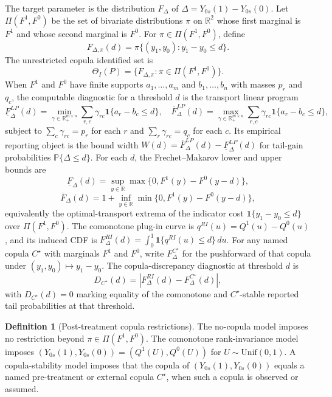 \documentclass[11pt]{article}
\renewcommand{\Pr}{\mathbb{P}}
\newcommand{\one}{\mathbf{1}}
\newcommand{\R}{\mathbb{R}}
\theoremstyle{definition}
\newtheorem{definition}{Definition}
\theoremstyle{plain}
\theoremstyle{remark}
\begin{document}
The target parameter is the distribution \(F_\Delta\) of \(\Delta=Y_{0s}(1)-Y_{0s}(0)\).  Let \(\Pi(F^1,F^0)\) be the set of bivariate distributions \(\pi\) on \(\R^2\) whose first marginal is \(F^1\) and whose second marginal is \(F^0\).  For \(\pi\in\Pi(F^1,F^0)\), define
\[
F_{\Delta,\pi}(d)=\pi\{(y_1,y_0):y_1-y_0\le d\}.
\]
The unrestricted copula identified set is
\[
\Theta_I(P)=\{F_{\Delta,\pi}:\pi\in\Pi(F^1,F^0)\}.
\]
When \(F^1\) and \(F^0\) have finite supports \(a_1,\ldots,a_m\) and \(b_1,\ldots,b_n\) with masses \(p_r\) and \(q_c\), the computable diagnostic for a threshold \(d\) is the transport linear program
\[
\underline F_\Delta^{LP}(d)=\min_{\gamma\in\R_+^{m\times n}}\sum_{r,c}\gamma_{rc}\one\{a_r-b_c\le d\},
\quad
\overline F_\Delta^{LP}(d)=\max_{\gamma\in\R_+^{m\times n}}\sum_{r,c}\gamma_{rc}\one\{a_r-b_c\le d\},
\]
subject to \(\sum_c\gamma_{rc}=p_r\) for each \(r\) and \(\sum_r\gamma_{rc}=q_c\) for each \(c\).  Its empirical reporting object is the bound width \(W(d)=\overline F_\Delta^{LP}(d)-\underline F_\Delta^{LP}(d)\) for tail-gain probabilities \(\Pr\{\Delta\le d\}\).
For each \(d\), the Frechet--Makarov lower and upper bounds are
\[
\underline F_\Delta(d)=\sup_{y\in\R}\max\{0,F^1(y)-F^0(y-d)\},
\]
\[
\overline F_\Delta(d)=1+\inf_{y\in\R}\min\{0,F^1(y)-F^0(y-d)\},
\]
equivalently the optimal-transport extrema of the indicator cost \(\one\{y_1-y_0\le d\}\) over \(\Pi(F^1,F^0)\).  The comonotone plug-in curve is \(q^{RI}(u)=Q^1(u)-Q^0(u)\), and its induced CDF is \(F^{RI}_\Delta(d)=\int_0^1\one\{q^{RI}(u)\le d\}\,du\).
For any named copula \(C^\star\) with marginals \(F^1\) and \(F^0\), write \(F^{C^\star}_\Delta\) for the pushforward of that copula under \((y_1,y_0)\mapsto y_1-y_0\).  The copula-discrepancy diagnostic at threshold \(d\) is
\[
D_{C^\star}(d)=|F^{RI}_\Delta(d)-F^{C^\star}_\Delta(d)|,
\]
with \(D_{C^\star}(d)=0\) marking equality of the comonotone and \(C^\star\)-stable reported tail probabilities at that threshold.

\begin{definition}[Post-treatment copula restrictions]\label{def:copulas}
The no-copula model imposes no restriction beyond \(\pi\in\Pi(F^1,F^0)\).  The comonotone rank-invariance model imposes \((Y_{0s}(1),Y_{0s}(0))=(Q^1(U),Q^0(U))\) for \(U\sim\mathrm{Unif}(0,1)\).  A copula-stability model imposes that the copula of \((Y_{0s}(1),Y_{0s}(0))\) equals a named pre-treatment or external copula \(C^\star\), when such a copula is observed or assumed.
\end{definition}
\end{document}
